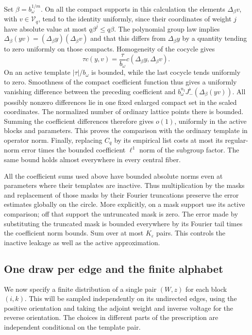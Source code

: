 Set \(\beta=b_\omega^{1/m}\).  On all the compact supports in this
calculation the elements \(\Delta_\beta v\), with
\(v\in\mathcal V_q\), tend to the identity uniformly, since their
coordinates of weight \(j\) have absolute value at most
\(q\beta^j\le q\beta\).  The polynomial group law implies
\(\Delta_\beta(yv)=(\Delta_\beta y)(\Delta_\beta v)\) and that
this differs from \(\Delta_\beta y\) by a quantity tending to
zero uniformly on those compacts.  Homogeneity of the cocycle gives
\[
 \tau c(y,v)=\frac\tau{b_\omega}
 c(\Delta_\beta y,\Delta_\beta v).
\]
On an active template \(|\tau|/b_\omega\) is bounded, while the
last cocycle tends uniformly to zero.  Smoothness of the compact
coefficient function thus gives a uniformly vanishing difference
between the preceding coefficient and
\(b_\omega^{n_{\mathrm f}}
 J_-^\flat(\Delta_\beta(yv))\).
All possibly nonzero differences lie in one fixed enlarged compact
set in the scaled coordinates.  The normalized number of ordinary
lattice points there is bounded.  Summing the coefficient differences
therefore gives \(o(1)\), uniformly in the active blocks and
parameters.  This proves the comparison with the ordinary template
in operator norm.  Finally, replacing \(C_q\) by its empirical list
costs at most its regular-norm error times the bounded coefficient
\(\ell^1\) norm of the subgroup factor.  The same bound holds almost
everywhere in every central fiber.

All the coefficient sums used above have bounded absolute norms even
at parameters where their templates are inactive.  Thus multiplication
by the masks and replacement of those masks by their Fourier
truncations preserve the error estimates globally on the circle.
More explicitly, on a mask support use its active comparison; off
that support the untruncated mask is zero.  The error made by
substituting the truncated mask is bounded everywhere by its Fourier
tail times the coefficient norm bounds.  Sum over at most
\(K_\varepsilon\) pairs.  This controls the inactive leakage as well
as the active approximation.

\subsection{One draw per edge and the finite alphabet}

We now specify a finite distribution of a single pair \((W,z)\) for
each block \((i,k)\).  This will be sampled independently on its
undirected edges, using the positive orientation and taking the
adjoint weight and inverse voltage for the reverse orientation.
The choices in different parts of the prescription are independent
conditional on the template pair.


